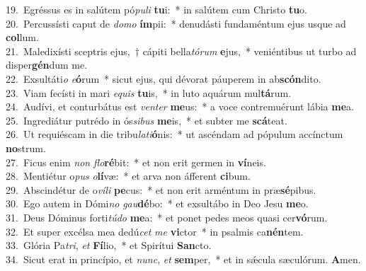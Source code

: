 {19.~}Egréssus es in salútem pó\textit{pu}\textit{li} \textbf{tu}i:~* in salútem cum Christo \textbf{tu}o.\\
{20.~}Percussísti caput de \textit{do}\textit{mo} \textbf{ím}pii:~* denudásti fundaméntum ejus usque ad \textbf{col}lum.\\
{21.~}Maledixísti sceptris ejus,~† cápiti bella\textit{tó}\textit{rum} \textbf{e}jus,~* veniéntibus ut turbo ad disper\textbf{gén}dum me.\\
{22.~}Exsultáti\textit{o} \textit{e}\textbf{ó}rum~* sicut ejus, qui dévorat páuperem in ab\textbf{scón}dito.\\
{23.~}Viam fecísti in mari \textit{e}\textit{quis} \textbf{tu}is,~* in luto aquárum mul\textbf{tá}rum.\\
{24.~}Audívi, et conturbátus est \textit{ven}\textit{ter} \textbf{me}us:~* a voce contremuérunt lábia \textbf{me}a.\\
{25.~}Ingrediátur putrédo in ós\textit{si}\textit{bus} \textbf{me}is,~* et subter me \textbf{scá}teat.\\
{26.~}Ut requiéscam in die tribu\textit{la}\textit{ti}\textbf{ó}nis:~* ut ascéndam ad pópulum accínctum \textbf{no}strum.\\
{27.~}Ficus enim \textit{non} \textit{flo}\textbf{ré}bit:~* et non erit germen in \textbf{ví}neis.\\
{28.~}Mentiétur o\textit{pus} \textit{o}\textbf{lí}væ:~* et arva non áfferent \textbf{ci}bum.\\
{29.~}Abscindétur de o\textit{ví}\textit{li} \textbf{pe}cus:~* et non erit arméntum in præ\textbf{sé}pibus.\\
{30.~}Ego autem in Dómi\textit{no} \textit{gau}\textbf{dé}bo:~* et exsultábo in Deo Jesu \textbf{me}o.\\
{31.~}Deus Dóminus forti\textit{tú}\textit{do} \textbf{me}a:~* et ponet pedes meos quasi cer\textbf{vó}rum.\\
{32.~}Et super excélsa mea dedú\textit{cet} \textit{me} \textbf{vi}ctor~* in psalmis ca\textbf{nén}tem.\\
{33.~}Glória Pa\textit{tri}, \textit{et} \textbf{Fí}lio,~* et Spirítui \textbf{San}cto.\\
{34.~}Sicut erat in princípio, et \textit{nunc}, \textit{et} \textbf{sem}per,~* et in sǽcula sæculórum. \textbf{A}men.\\
